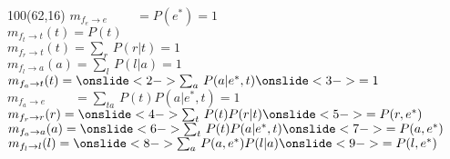 \documentclass[shownotes,aspectratio=169]{beamer}
\begin{document}
\begin{frame}[plain]
\begin{textblock}{100}(62,16)
 $m_{f_e\rightarrow e}\phantom{(e)} = P(e^*) = 1 $  \\
 $m_{f_t\rightarrow t}(t) = P(t)$  \\
 $m_{f_r\rightarrow t}(t) = \sum_r \, P(r|t) = 1$  \\
 $m_{f_l\rightarrow a}(a) = \sum_l \, P(l|a) = 1 $  \\
 $m_{f_a\rightarrow t}(t) = \onslide<2->{\sum_{a} \, P(a|e^*,t)} \onslide<3->{= 1}$  \\
 $m_{f_a\rightarrow e}\phantom{(e)} = \sum_{ta} \, P(t) P(a|e^*,t) = 1$  \\
 $m_{f_r\rightarrow r}(r) = \onslide<4->{\sum_{t} \, P(t) P(r|t)} \onslide<5->{= P(r,e^*)}$ \\
 $m_{f_a\rightarrow a}(a) = \onslide<6->{\sum_{t} \, P(t)P(a|e^*,t)}\onslide<7->{  = P(a,e^*)}$  \\
 $m_{f_l\rightarrow l}(l) = \onslide<8->{\sum_{a} \, P(a,e^*) P(l|a)} \onslide<9->{ = P(l,e^*)}$
 \end{textblock}

 


\end{frame}
\end{document}
